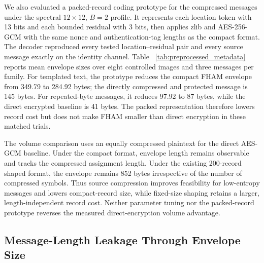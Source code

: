 \documentclass[preprint,12pt]{elsarticle}
\theoremstyle{plain}
\begin{document}
\begin{table}[!t]
\centering
\small
\caption{Compact record size for the controlled 200-character cohort under $B=2$, without pre-assignment source compression.}
\label{tab:channel_bounded}

\end{table}

We also evaluated a packed-record coding prototype for the compressed
messages under the spectral $12\times12$, $B=2$ profile. It represents each
location token with 13 bits and each bounded residual with 3 bits, then applies
zlib and AES-256-GCM with the same nonce and authentication-tag lengths as the
compact format. The decoder reproduced every tested location--residual pair
and every source message exactly on the identity channel. Table
~\ref{tab:preprocessed_metadata} reports mean envelope sizes over eight
controlled images and three messages per family. For templated text, the
prototype reduces the compact FHAM envelope from 349.79 to 284.92 bytes; the
directly compressed and protected message is 145 bytes. For repeated-byte
messages, it reduces 97.92 to 87 bytes, while the direct encrypted baseline is
41 bytes. The packed representation therefore lowers record cost but does not
make FHAM smaller than direct encryption in these matched trials.

\begin{table}[!t]
\centering
\small
\caption{Protected Metadata after Lossless Message Compression (Bytes)}
\label{tab:preprocessed_metadata}
\resizebox{\linewidth}{!}{}
\end{table}

The volume comparison uses an equally compressed plaintext for the direct
AES-GCM baseline. Under the compact format, envelope length remains observable
and tracks the compressed assignment length. Under the existing 200-record
shaped format, the envelope remains 852 bytes irrespective of the number of
compressed symbols. Thus source compression improves feasibility for
low-entropy messages and lowers compact-record size, while fixed-size shaping
retains a larger, length-independent record cost. Neither parameter tuning nor
the packed-record prototype reverses the measured direct-encryption volume
advantage.

\subsection{Message-Length Leakage Through Envelope Size}
\end{document}
